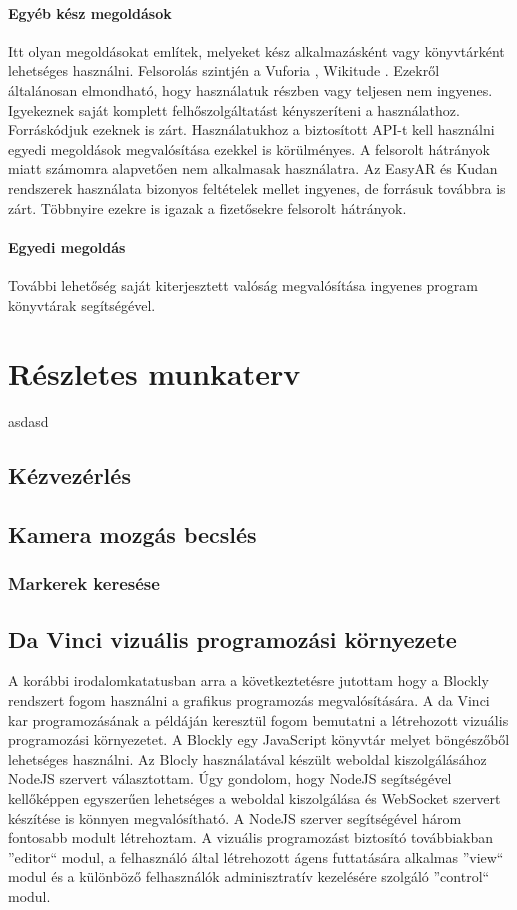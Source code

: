 \documentclass[12pt,a4paper,oneside]{report} %
\begin{document}
\subsubsection{Egyéb kész megoldások}
Itt olyan megoldásokat említek, melyeket kész alkalmazásként vagy könyvtárként lehetséges használni. Felsorolás szintjén a Vuforia \cite{vuforia}, Wikitude \cite{wikitude}.
Ezekről általánosan elmondható, hogy használatuk részben vagy teljesen nem ingyenes. Igyekeznek saját komplett felhőszolgáltatást kényszeríteni a használathoz. Forráskódjuk ezeknek is zárt. Használatukhoz a biztosított API-t kell használni egyedi megoldások megvalósítása ezekkel is körülményes.  A felsorolt hátrányok miatt számomra alapvetően nem alkalmasak használatra.
Az EasyAR \cite{ezar} és Kudan \cite{kudan} rendszerek használata bizonyos feltételek mellet ingyenes, de forrásuk továbbra is zárt. Többnyire ezekre is igazak a  fizetősekre felsorolt hátrányok.

\subsubsection{Egyedi megoldás}
További lehetőség saját kiterjesztett valóság megvalósítása ingyenes program könyvtárak segítségével. 

\chapter{Részletes munkaterv}
asdasd
\begin{figure}[H]
\end{figure}
\section{Kézvezérlés}
\label{kezvez}
\section{Kamera mozgás becslés}
\subsection{Markerek keresése}

\section{Da Vinci vizuális programozási környezete}
A korábbi irodalomkatatusban arra a következtetésre jutottam hogy a Blockly rendszert fogom használni a  grafikus programozás megvalósítására.
A da Vinci kar programozásának a példáján keresztül fogom bemutatni a létrehozott vizuális programozási környezetet.
A Blockly egy JavaScript könyvtár melyet böngészőből lehetséges használni. Az Blocly használatával készült weboldal kiszolgálásához NodeJS szervert választottam. Úgy gondolom, hogy NodeJS segítségével kellőképpen egyszerűen lehetséges a weboldal kiszolgálása és WebSocket szervert készítése is könnyen megvalósítható. A NodeJS szerver segítségével három fontosabb modult létrehoztam. A vizuális programozást biztosító továbbiakban ''editor`` modul, a felhasználó által létrehozott ágens futtatására alkalmas ''view`` modul és a különböző felhasználók adminisztratív kezelésére szolgáló ''control`` modul.
\end{document}

